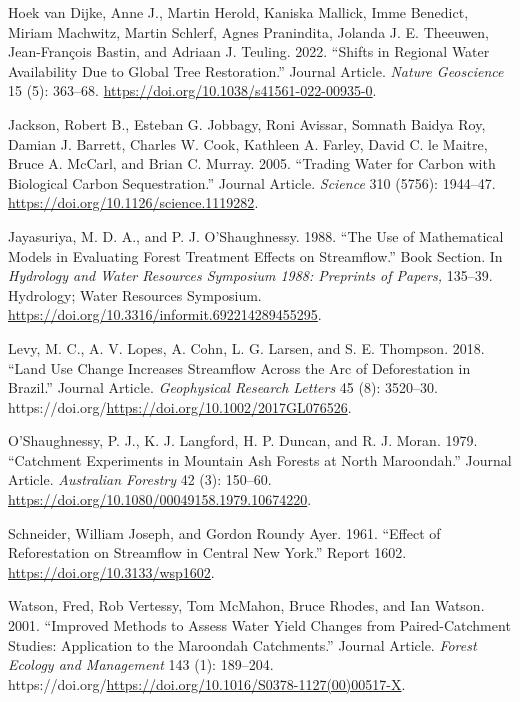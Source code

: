 \documentclass[]{elsarticle} %
\newlength{\cslhangindent}
\newlength{\cslentryspacingunit} %
\newenvironment{CSLReferences}[2] %
 {%
  \setlength{\parindent}{0pt}
  \ifodd #1
  \let\oldpar\par
  \def\par{\hangindent=\cslhangindent\oldpar}
  \fi
  \setlength{\parskip}{#2\cslentryspacingunit}
 }%
 {}
\begin{document}
\begin{CSLReferences}{1}{0}
\leavevmode{}%
Hoek van Dijke, Anne J., Martin Herold, Kaniska Mallick, Imme Benedict, Miriam Machwitz, Martin Schlerf, Agnes Pranindita, Jolanda J. E. Theeuwen, Jean-François Bastin, and Adriaan J. Teuling. 2022. {``Shifts in Regional Water Availability Due to Global Tree Restoration.''} Journal Article. \emph{Nature Geoscience} 15 (5): 363--68. \url{https://doi.org/10.1038/s41561-022-00935-0}.

\leavevmode{}%
Jackson, Robert B., Esteban G. Jobbagy, Roni Avissar, Somnath Baidya Roy, Damian J. Barrett, Charles W. Cook, Kathleen A. Farley, David C. le Maitre, Bruce A. McCarl, and Brian C. Murray. 2005. {``Trading Water for Carbon with Biological Carbon Sequestration.''} Journal Article. \emph{Science} 310 (5756): 1944--47. \url{https://doi.org/10.1126/science.1119282}.

\leavevmode{}%
Jayasuriya, M. D. A., and P. J. O'Shaughnessy. 1988. {``The Use of Mathematical Models in Evaluating Forest Treatment Effects on Streamflow.''} Book Section. In \emph{Hydrology and Water Resources Symposium 1988: Preprints of Papers,} 135--39. Hydrology; Water Resources Symposium. \url{https://doi.org/10.3316/informit.692214289455295}.

\leavevmode{}%
Levy, M. C., A. V. Lopes, A. Cohn, L. G. Larsen, and S. E. Thompson. 2018. {``Land Use Change Increases Streamflow Across the Arc of Deforestation in Brazil.''} Journal Article. \emph{Geophysical Research Letters} 45 (8): 3520--30. https://doi.org/\url{https://doi.org/10.1002/2017GL076526}.

\leavevmode{}%
O'Shaughnessy, P. J., K. J. Langford, H. P. Duncan, and R. J. Moran. 1979. {``Catchment Experiments in Mountain Ash Forests at North Maroondah.''} Journal Article. \emph{Australian Forestry} 42 (3): 150--60. \url{https://doi.org/10.1080/00049158.1979.10674220}.

\leavevmode{}%
Schneider, William Joseph, and Gordon Roundy Ayer. 1961. {``Effect of Reforestation on Streamflow in Central New York.''} Report 1602. \url{https://doi.org/10.3133/wsp1602}.

\leavevmode{}%
Watson, Fred, Rob Vertessy, Tom McMahon, Bruce Rhodes, and Ian Watson. 2001. {``Improved Methods to Assess Water Yield Changes from Paired-Catchment Studies: Application to the Maroondah Catchments.''} Journal Article. \emph{Forest Ecology and Management} 143 (1): 189--204. https://doi.org/\url{https://doi.org/10.1016/S0378-1127(00)00517-X}.


\end{CSLReferences}
\end{document}
